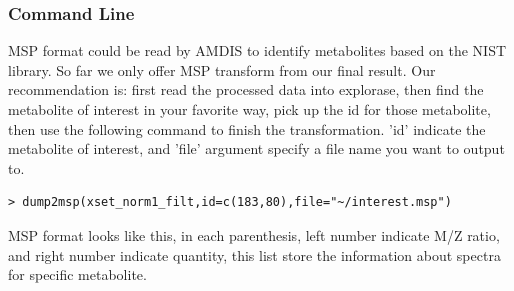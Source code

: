 \documentclass[11pt,a4paper]{article}
\begin{document}
\subsubsection*{Command Line}
MSP format could be read by AMDIS to identify metabolites based on the
NIST library. So far we only offer MSP transform from our final
result.  Our recommendation is: first read the processed data into
explorase, then find the metabolite of interest in your favorite way,
pick up the id for those metabolite, then use the following command to
finish the transformation. 'id' indicate the metabolite of interest,
and 'file' argument specify a file name you want to output to.
\begin{verbatim}
> dump2msp(xset_norm1_filt,id=c(183,80),file="~/interest.msp")
\end{verbatim}
MSP format looks like this, in each parenthesis, left number indicate M/Z ratio, and 
right number indicate quantity, this list store the information about spectra for 
specific metabolite.
\end{document}
